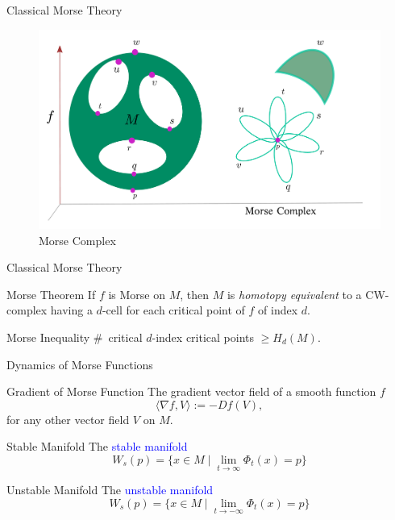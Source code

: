 \documentclass[10pt,sans-serif]{beamer}
\begin{document}
\begin{frame}{Classical Morse Theory}
  \begin{figure}
    \centering
    \includegraphics[scale=0.2]{5}
    \caption{Morse Complex}
  \end{figure}
\end{frame}

\begin{frame}{Classical Morse Theory}
  \begin{block}{Morse Theorem}
    If $f$ is Morse on $M$, then $M$ is \emph{homotopy equivalent} to a
    CW-complex having a $d$-cell for each critical point of $f$ of index $d$.
  \end{block}

  \pause
  
  \begin{block}{Morse Inequality}
    \#~critical $d$-index critical points $\geq H_d(M)$.
  \end{block}
\end{frame}


\begin{frame}{Dynamics of Morse Functions}
  \begin{block}{Gradient of Morse Function}  
    The gradient vector field of a smooth function $f$
    $$\langle\nabla f,V\rangle:=-Df(V),$$
    for any other vector field $V$ on $M$.
  \end{block}

  \pause
  
  \begin{block}{Stable Manifold}
    The \textcolor{blue}{stable manifold} $$W_s(p)=\{x\in
    M\mid\lim_{t\to\infty}\Phi_t(x)=p\}$$
  \end{block}

  \pause
  
  \begin{block}{Unstable Manifold}
    The \textcolor{blue}{unstable manifold} $$W_s(p)=\{x\in
    M\mid\lim_{t\to-\infty}\Phi_t(x)=p\}$$
  \end{block}  
  
\end{frame}
\end{document}
